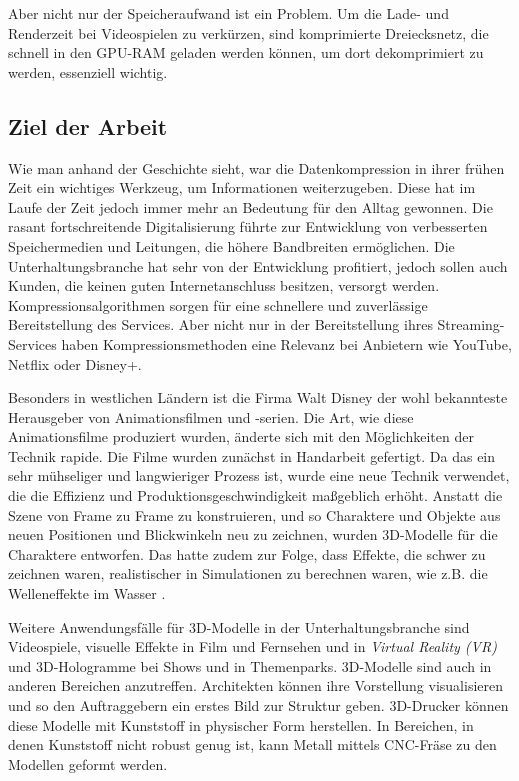 Aber nicht nur der Speicheraufwand ist ein Problem.
Um die Lade- und Renderzeit bei Videospielen zu verkürzen, sind komprimierte Dreiecksnetz, die schnell in den GPU-RAM geladen werden können, um dort dekomprimiert zu werden, essenziell wichtig.

\subsection{Ziel der Arbeit}
Wie man anhand der Geschichte sieht, war die Datenkompression in ihrer frühen Zeit ein wichtiges Werkzeug, um Informationen weiterzugeben.
Diese hat im Laufe der Zeit jedoch immer mehr an Bedeutung für den Alltag gewonnen.
Die rasant fortschreitende Digitalisierung führte zur Entwicklung von verbesserten Speichermedien und Leitungen, die höhere Bandbreiten ermöglichen.
Die Unterhaltungsbranche hat sehr von der Entwicklung profitiert, jedoch sollen auch Kunden, die keinen guten Internetanschluss besitzen, versorgt werden.
Kompressionsalgorithmen sorgen für eine schnellere und zuverlässige Bereitstellung des Services.
Aber nicht nur in der Bereitstellung ihres Streaming-Services haben Kompressionsmethoden eine Relevanz bei Anbietern wie YouTube, Netflix oder Disney+. \newline

Besonders in westlichen Ländern ist die Firma Walt Disney der wohl bekannteste Herausgeber von Animationsfilmen und -serien.
Die Art, wie diese Animationsfilme produziert wurden, änderte sich mit den Möglichkeiten der Technik rapide.
Die Filme wurden zunächst in Handarbeit gefertigt.
Da das ein sehr mühseliger und langwieriger Prozess ist, wurde eine neue Technik verwendet, die die Effizienz und Produktionsgeschwindigkeit maßgeblich erhöht.
Anstatt die Szene von Frame zu Frame zu konstruieren, und so Charaktere und Objekte aus neuen Positionen und Blickwinkeln neu zu zeichnen, wurden 3D-Modelle für die Charaktere entworfen.
Das hatte zudem zur Folge, dass Effekte, die schwer zu zeichnen waren, realistischer in Simulationen zu berechnen waren, wie z.B. die Welleneffekte im Wasser \cite{Disney2021}. \newline

Weitere Anwendungsfälle für 3D-Modelle in der Unterhaltungsbranche sind Videospiele, visuelle Effekte in Film und Fernsehen und in \textit{Virtual Reality (VR)} und 3D-Hologramme bei Shows und in Themenparks. 
3D-Modelle sind auch in anderen Bereichen anzutreffen.
Architekten können ihre Vorstellung visualisieren und so den Auftraggebern ein erstes Bild zur Struktur geben.
3D-Drucker können diese Modelle mit Kunststoff in physischer Form herstellen.
In Bereichen, in denen Kunststoff nicht robust genug ist, kann Metall mittels CNC-Fräse zu den Modellen geformt werden. \newline

